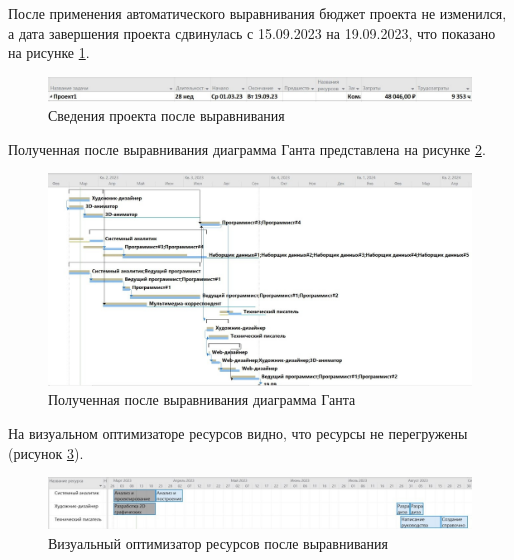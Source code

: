 После применения автоматического выравнивания бюджет проекта не изменился, а дата завершения проекта сдвинулась с 15.09.2023 на 19.09.2023, что показано на рисунке \ref{img:task1-state}.

\begin{figure}[H]
	\begin{center}
		\includegraphics[scale=0.3]{inc/img/task1-state.jpg}
	\end{center}
	\captionsetup{justification=centering}
	\caption{Сведения проекта после выравнивания}
	\label{img:task1-state}
\end{figure}

Полученная после выравнивания диаграмма Ганта представлена на рисунке \ref{img:task1-diagram}.

\begin{figure}[H]
	\begin{center}
		\includegraphics[scale=0.3]{inc/img/task1-diagram.jpg}
	\end{center}
	\captionsetup{justification=centering}
	\caption{Полученная после выравнивания диаграмма Ганта}
	\label{img:task1-diagram}
\end{figure}

На визуальном оптимизаторе ресурсов видно, что ресурсы не перегружены (рисунок \ref{img:task1-recources}).

\begin{figure}[H]
	\begin{center}
		\includegraphics[scale=0.3]{inc/img/task1-resources.jpg}
	\end{center}
	\captionsetup{justification=centering}
	\caption{Визуальный оптимизатор ресурсов после выравнивания}
	\label{img:task1-recources}
\end{figure}
 
